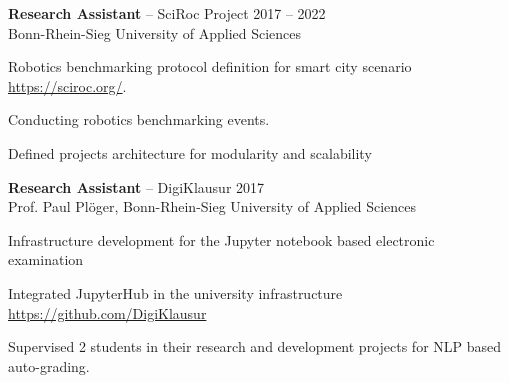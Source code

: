 \documentclass{article}
\newcommand{\employer}[4]{{
\vspace*{2pt}%
\textbf{#1} #2 \hfill #3\\ #4 \vspace*{2pt}}
}
\renewcommand{\labelitemii}{
$\vcenter{\hbox{\tiny$\bullet$}}$\hspace*{-3pt}
}
\newenvironment{bullet-list-minor}{
\begin{list}{\labelitemii}{\setlength\leftmargin{15pt} 
\topsep 0pt \itemsep -2pt}}{\vspace*{4pt}\end{list}
}
\begin{document}
    \employer{Research Assistant}{-- SciRoc Project}{2017 -- 2022}
    {Bonn-Rhein-Sieg University of Applied Sciences}
	\begin{bullet-list-minor}
	\item Robotics benchmarking protocol definition for smart city scenario \url{https://sciroc.org/}. 
    \item Conducting robotics benchmarking events.
	\item Defined projects architecture for modularity and scalability
    \end{bullet-list-minor}
    

    \employer{Research Assistant}{-- DigiKlausur}{2017}
    {Prof. Paul Pl\"{o}ger, Bonn-Rhein-Sieg University of Applied Sciences}
    \begin{bullet-list-minor}
    \item Infrastructure development for the Jupyter notebook based electronic examination
    \item Integrated JupyterHub in the university infrastructure \url{https://github.com/DigiKlausur}
    \item Supervised 2 students in their research and development projects for NLP based auto-grading.
    \end{bullet-list-minor}

\end{document}
